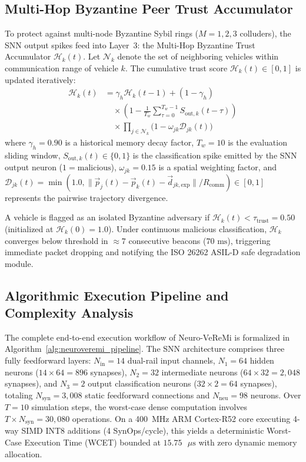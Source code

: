 \documentclass[journal]{IEEEtran}
\begin{document}
\subsection{Multi-Hop Byzantine Peer Trust Accumulator}
To protect against multi-node Byzantine Sybil rings ($M=1, 2, 3$ colluders), the SNN output spikes feed into Layer~3: the Multi-Hop Byzantine Trust Accumulator $\mathcal{H}_k(t)$. Let $\mathcal{N}_k$ denote the set of neighboring vehicles within communication range of vehicle $k$. The cumulative trust score $\mathcal{H}_k(t) \in [0, 1]$ is updated iteratively:
\begin{equation}
\begin{split}
    \mathcal{H}_k(t) 
    &= \gamma_h \mathcal{H}_k(t - 1) + (1 - \gamma_h) \\
    &\quad \times \left( 1 - \frac{1}{T_w}\sum_{\tau=0}^{T_w - 1} S_{\text{out}, k}(t - \tau) \right) \\
    &\quad \times \prod_{j \in \mathcal{N}_k} \big(1 - \omega_{jk} \mathcal{D}_{jk}(t)\big)
\end{split}
\end{equation}
where $\gamma_h = 0.90$ is a historical memory decay factor, $T_w = 10$ is the evaluation sliding window, $S_{\text{out}, k}(t) \in \{0, 1\}$ is the classification spike emitted by the SNN output neuron ($1 = \text{malicious}$), $\omega_{jk} = 0.15$ is a spatial weighting factor, and $\mathcal{D}_{jk}(t) = \min(1.0, \|\vec{p}_j(t) - \vec{p}_k(t) - \vec{d}_{jk,\text{exp}}\| / R_{\text{comm}}) \in [0, 1]$ represents the pairwise trajectory divergence.

A vehicle is flagged as an isolated Byzantine adversary if $\mathcal{H}_k(t) < \tau_{\text{trust}} = 0.50$ (initialized at $\mathcal{H}_k(0) = 1.0$). Under continuous malicious classification, $\mathcal{H}_k$ converges below threshold in $\approx 7$ consecutive beacons ($70\text{ ms}$), triggering immediate packet dropping and notifying the ISO 26262 ASIL-D safe degradation module.

\subsection{Algorithmic Execution Pipeline and Complexity Analysis}
The complete end-to-end execution workflow of Neuro-VeReMi is formalized in Algorithm~\ref{alg:neuroveremi_pipeline}. The SNN architecture comprises three fully feedforward layers: $N_{\text{in}} = 14$ dual-rail input channels, $N_1 = 64$ hidden neurons ($14 \times 64 = 896$ synapses), $N_2 = 32$ intermediate neurons ($64 \times 32 = 2{,}048$ synapses), and $N_3 = 2$ output classification neurons ($32 \times 2 = 64$ synapses), totaling $N_{\text{syn}} = 3{,}008$ static feedforward connections and $N_{\text{neu}} = 98$ neurons. Over $T = 10$ simulation steps, the worst-case dense computation involves $T \times N_{\text{syn}} = 30{,}080$ operations. On a 400~MHz ARM Cortex-R52 core executing 4-way SIMD INT8 additions (4 SynOps/cycle), this yields a deterministic Worst-Case Execution Time (WCET) bounded at $15.75\text{ }\mu\text{s}$ with zero dynamic memory allocation.
\end{document}
